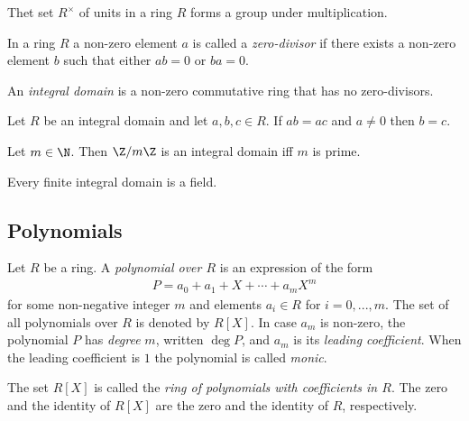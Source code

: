 \documentclass{article}
\begin{document}
\begin{proposition}
	Thet set $R^\times$ of units in a ring $R$ forms a group under multiplication.
\end{proposition}

\begin{definition}
	In a ring $R$ a non-zero element $a$ is called a \emph{zero-divisor} if
	there exists a non-zero element $b$ such that either $ab=0$ or $ba=0$.
\end{definition}

\begin{definition}
	An \emph{integral domain} is a non-zero commutative ring that has no zero-divisors.
\end{definition}

\begin{proposition}[Notes 3.2.15]
	Let $R$ be an integral domain and let $a,b,c\in R$. If $ab=ac$ and $a\not=0$
	then $b=c$.
\end{proposition}

\begin{proposition}[Notes 3.2.16]
	Let $m\in\N$. Then $\Z/m\Z$ is an integral domain iff $m$ is prime.
\end{proposition}

\begin{theorem}[Notes 3.2.17]
	Every finite integral domain is a field.
\end{theorem}

\subsection{Polynomials}

\begin{definition}
	Let $R$ be a ring. A \emph{polynomial over $R$} is an expression of the form
	\begin{align*}
		P=a_0+a_1+X+\cdots+a_mX^m
	\end{align*}
	for some non-negative integer $m$ and elements $a_i\in R$ for $i=0,...,m$.
	The set of all polynomials over $R$ is denoted by $R[X]$. In case $a_m$
	is non-zero, the polynomial $P$ has \emph{degree} $m$, written $\deg P$,
	and $a_m$ is its \emph{leading coefficient}. When the leading coefficient is
	$1$ the polynomial is called \emph{monic}.
\end{definition}

\begin{definition}
	The set $R[X]$ is called the \emph{ring of polynomials with coefficients
		in $R$}. The zero and the identity of $R[X]$ are the zero and the identity of
	$R$, respectively.
\end{definition}
\end{document}
